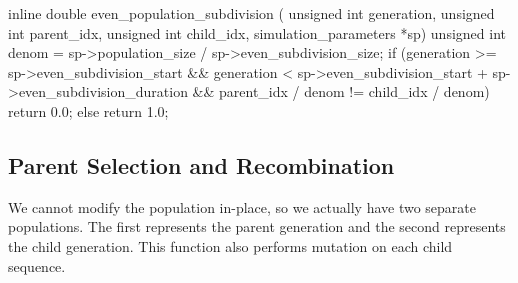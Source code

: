 \documentclass{article}
\begin{document}
\begin{ccode}
inline double even_population_subdivision (
    unsigned int generation, unsigned int parent_idx,
    unsigned int child_idx, simulation_parameters *sp) {
  unsigned int denom = sp->population_size / sp->even_subdivision_size;
  if (generation >= sp->even_subdivision_start &&
      generation < sp->even_subdivision_start + sp->even_subdivision_duration &&
      parent_idx / denom != child_idx / denom)
    return 0.0;
  else
    return 1.0;
}
\end{ccode}

    \subsection{Parent Selection and Recombination}

      We cannot modify the population in-place, so we actually have two separate
      populations. The first represents the parent generation and the second
      represents the child generation. This function also performs mutation on
      each child sequence.
\end{document}
